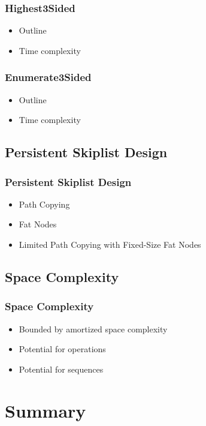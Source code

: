 \documentclass{beamer}
\begin{document}
\begin{frame}
  \frametitle{Highest3Sided}

  \begin{itemize}
  \item
    Outline 
  \item
    Time complexity
  \end{itemize}
\end{frame}

\begin{frame}
  \frametitle{Enumerate3Sided}

  \begin{itemize}
  \item
    Outline 
  \item
    Time complexity
  \end{itemize}
\end{frame}

\subsection{Persistent Skiplist Design}

\begin{frame}
  \frametitle{Persistent Skiplist Design}

  \begin{itemize}
  \item
    Path Copying
  \item
    Fat Nodes
  \item
    Limited Path Copying with Fixed-Size Fat Nodes
  \end{itemize}
\end{frame}

\subsection{Space Complexity}

\begin{frame}
  \frametitle{Space Complexity}

  \begin{itemize}
  \item
    Bounded by amortized space complexity
  \item
    Potential for operations
  \item
    Potential for sequences
  \end{itemize}  
\end{frame}

\section*{Summary}
\end{document}
